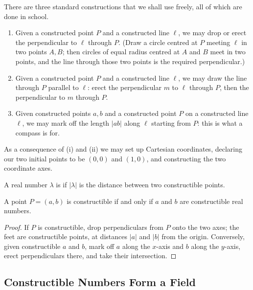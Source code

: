 There are three standard constructions that we shall use freely, all of which are done in school.

\begin{enumerate}[label=(\roman*)]
	\item Given a constructed point $P$ and a constructed line $\ell$, we may drop or erect the perpendicular to $\ell$ through $P$. (Draw a circle centred at $P$ meeting $\ell$ in two points $A, B$; then circles of equal radius centred at $A$ and $B$ meet in two points, and the line through those two points is the required perpendicular.)
	\item Given a constructed point $P$ and a constructed line $\ell$, we may draw the line through $P$ parallel to $\ell$: erect the perpendicular $m$ to $\ell$ through $P$, then the perpendicular to $m$ through $P$.
	\item Given constructed points $a, b$ and a constructed point $P$ on a constructed line $\ell$, we may mark off the length $|ab|$ along $\ell$ starting from $P$: this is what a compass is for.
\end{enumerate}

As a consequence of (i) and (ii) we may set up Cartesian coordinates, declaring our two initial points to be $(0,0)$ and $(1,0)$, and constructing the two coordinate axes.

\begin{definition}
	A real number $\lambda$ is  if $|\lambda|$ is the distance between two constructible points.
\end{definition}

\begin{lemma}
	A point $P = (a,b)$ is constructible if and only if $a$ and $b$ are constructible real numbers.
\end{lemma}

\begin{proof}
	If $P$ is constructible, drop perpendiculars from $P$ onto the two axes; the feet are constructible points, at distances $|a|$ and $|b|$ from the origin. Conversely, given constructible $a$ and $b$, mark off $a$ along the $x$-axis and $b$ along the $y$-axis, erect perpendiculars there, and take their intersection.
\end{proof}

\subsection{Constructible Numbers Form a Field}

